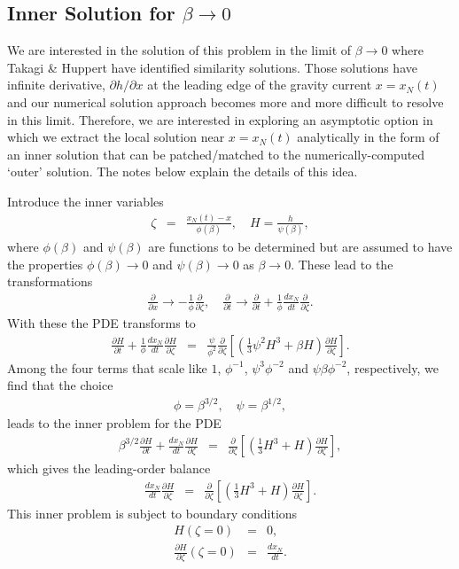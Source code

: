 \documentclass[11pt]{article}
\newcommand{\bea}{\begin{eqnarray}}
\newcommand{\eea}{\end{eqnarray}}
\begin{document}
\subsection{Inner Solution for $\beta \rightarrow 0$}

We are interested in the solution of this problem in the limit of $\beta \rightarrow 0$ where Takagi \& Huppert have identified similarity solutions.  Those solutions have
infinite derivative, $\partial h/\partial x$ at the leading edge of the gravity current $x=x_N(t)$ and our numerical solution approach becomes more and more difficult to resolve  in this limit.  Therefore, we are interested in exploring an asymptotic option in which we extract the local solution near $x=x_N(t)$ analytically in the form of an inner solution that can be patched/matched to the numerically-computed `outer' solution.  The notes below explain the details of this idea.

Introduce the inner variables
\bea
\zeta & = & \frac{x_N(t) - x}{\phi(\beta)},\quad
H = \frac{h}{\psi(\beta)},
\eea
where $\phi(\beta)$ and $\psi(\beta)$ are functions to be determined but are assumed to have the properties 
$\phi(\beta) \rightarrow 0$ and $\psi(\beta) \rightarrow 0$ as $\beta \rightarrow 0$.  These lead to the transformations
\bea
\frac{\partial}{\partial x}  \rightarrow  - \frac{1}{\phi} \frac{\partial}{\partial \zeta},\quad
\frac{\partial}{\partial t}  \rightarrow  \frac{\partial}{\partial t} + \frac{1}{\phi} \frac{dx_N}{dt} \frac{\partial}{\partial \zeta}.
\eea
With these the PDE transforms to
\bea
\frac{\partial H}{\partial t} + \frac{1}{\phi} \frac{dx_N}{dt} \frac{\partial H}{\partial \zeta} & = & \frac{\psi}{\phi^2} \frac{\partial}{\partial \zeta} 
\left[ \left( \frac{1}{3} \psi^2 H^3 + \beta H \right) \frac{\partial H}{\partial \zeta} \right].
\eea
Among the four terms that scale like $1$, $\phi^{-1}$, $\psi^3 \phi^{-2}$ and $\psi \beta \phi^{-2}$, respectively, we find that the choice
\bea
\phi = \beta^{3/2},\quad
\psi = \beta^{1/2},
\eea
leads to the inner problem for the PDE
\bea
\beta^{3/2} \frac{\partial H}{\partial t} + \frac{dx_N}{dt} \frac{\partial H}{\partial \zeta} & = & \frac{\partial}{\partial \zeta} 
\left[ \left( \frac{1}{3} H^3 + H \right) \frac{\partial H}{\partial \zeta} \right],
\eea
which gives the leading-order balance
\bea
\label{eq:leading_order_inner}
\frac{dx_N}{dt} \frac{\partial H}{\partial \zeta} & = & \frac{\partial}{\partial \zeta} 
\left[ \left( \frac{1}{3} H^3 + H \right) \frac{\partial H}{\partial \zeta} \right].
\eea
This inner problem is subject to boundary conditions 
\bea
H(\zeta=0) & = & 0, \\
\frac{\partial H}{\partial \zeta}(\zeta=0) & = & \frac{dx_N}{dt}.
\eea
\end{document}
